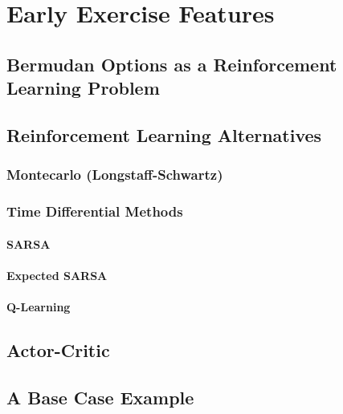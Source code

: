 \chapter{Early Exercise Features}
\label{chap:Bermudas}

\section{Bermudan Options as a Reinforcement Learning Problem}

\section{Reinforcement Learning Alternatives}
\subsection{Montecarlo (Longstaff-Schwartz)}
\subsection{Time Differential Methods}
\subsubsection{SARSA}
\subsubsection{Expected SARSA}
\subsubsection{Q-Learning}
\section{Actor-Critic}
\section{A Base Case Example}